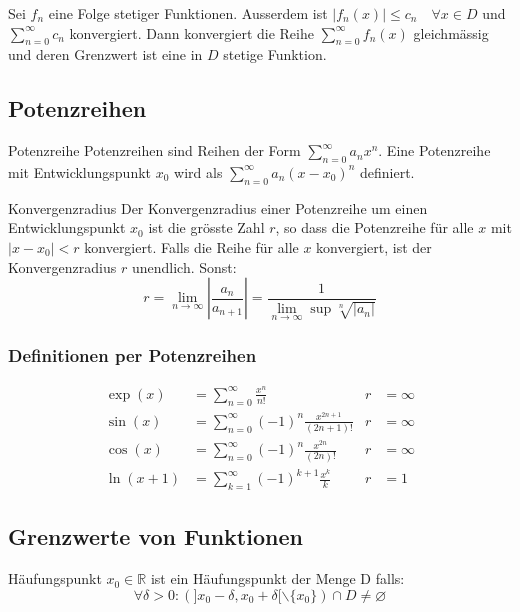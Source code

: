 \documentclass[a4paper,8pt]{extarticle}
\def\limn{\lim_{n\to \infty}}
\def\sumk{\sum_{k=1}^\infty}
\def\sumn{\sum_{n=0}^\infty}
\def\R{\mathbb{R}}
\begin{document}
\begin{subbox}{}
 Sei $f_n$ eine Folge stetiger Funktionen. Ausserdem ist $|f_n(x)| \le c_n \quad \forall x \in D$ und $\sum_{n=0}^\infty c_n$ konvergiert. Dann konvergiert die Reihe $\sum_{n=0}^\infty f_n(x)$ gleichmässig und deren Grenzwert ist eine in $D$ stetige Funktion.
\end{subbox}

\subsection{Potenzreihen}
\begin{subbox}{Potenzreihe}
 Potenzreihen sind Reihen der Form $\sum_{n=0}^\infty a_n x^n$. Eine Potenzreihe mit Entwicklungspunkt $x_0$ wird als $\sum_{n=0}^\infty a_n(x-x_0)^n$ definiert.
\end{subbox}

\begin{mainbox}{Konvergenzradius}
 Der Konvergenzradius einer Potenzreihe um einen Entwicklungspunkt $x_0$ ist die grösste Zahl $r$, so dass die Potenzreihe für alle $x$ mit $|x - x_0| < r$ konvergiert. Falls die Reihe für alle $x$ konvergiert, ist der Konvergenzradius $r$ unendlich. Sonst:
 $$r = \limn \left| \frac{a_n}{a_{n+1}} \right| = \frac{1}{\limn\sup \sqrt[n]{|a_n|}} $$
\end{mainbox}

\subsubsection{Definitionen per Potenzreihen}
\begin{align*}
\exp(x) &= \sumn \frac{x^n}{n!} & r &= \infty \\
\sin(x) &= \sumn (-1)^n \frac{x^{2n + 1}}{(2n + 1)!} & r &= \infty \\
\cos(x) &= \sumn (-1)^n \frac{x^{2n}}{(2n)!} & r &= \infty \\
\ln(x + 1) &= \sumk (-1)^{k+1} \frac{x^k}{k} & r &= 1
\end{align*}

\subsection{Grenzwerte von Funktionen}
\begin{subbox}{Häufungspunkt}
 $x_0 \in \R$ ist ein Häufungspunkt der Menge D falls: $$\forall \delta > 0: (]x_0 - \delta, x_0 + \delta[ \backslash \{x_0\}) \cap D \ne \varnothing$$
\end{subbox}
\end{document}
